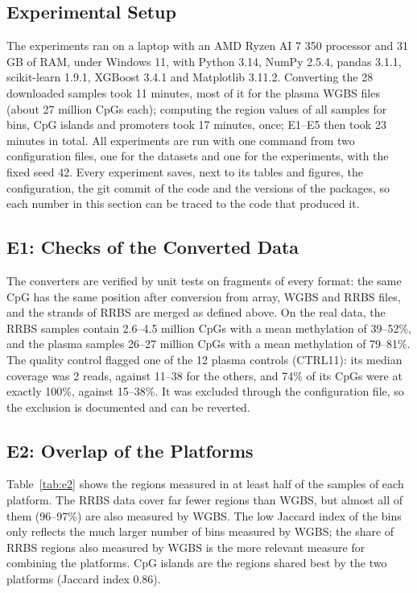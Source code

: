 \documentclass[runningheads]{llncs}
\begin{document}
\subsection{Experimental Setup}
The experiments ran on a laptop with an AMD Ryzen AI 7 350 processor and 31\,GB of RAM, under Windows 11, with Python 3.14, NumPy 2.5.4, pandas 3.1.1, scikit-learn 1.9.1, XGBoost 3.4.1 and Matplotlib 3.11.2. Converting the 28 downloaded samples took 11 minutes, most of it for the plasma WGBS files (about 27 million CpGs each); computing the region values of all samples for bins, CpG islands and promoters took 17 minutes, once; E1--E5 then took 23 minutes in total. All experiments are run with one command from two configuration files, one for the datasets and one for the experiments, with the fixed seed 42. Every experiment saves, next to its tables and figures, the configuration, the git commit of the code and the versions of the packages, so each number in this section can be traced to the code that produced it.

\subsection{E1: Checks of the Converted Data}
The converters are verified by unit tests on fragments of every format: the same CpG has the same position after conversion from array, WGBS and RRBS files, and the strands of RRBS are merged as defined above. On the real data, the RRBS samples contain 2.6--4.5 million CpGs with a mean methylation of 39--52\%, and the plasma samples 26--27 million CpGs with a mean methylation of 79--81\%. The quality control flagged one of the 12 plasma controls (CTRL11): its median coverage was 2 reads, against 11--38 for the others, and 74\% of its CpGs were at exactly 100\%, against 15--38\%. It was excluded through the configuration file, so the exclusion is documented and can be reverted.

\subsection{E2: Overlap of the Platforms}
Table~\ref{tab:e2} shows the regions measured in at least half of the samples of each platform. The RRBS data cover far fewer regions than WGBS, but almost all of them (96--97\%) are also measured by WGBS. The low Jaccard index of the bins only reflects the much larger number of bins measured by WGBS; the share of RRBS regions also measured by WGBS is the more relevant measure for combining the platforms. CpG islands are the regions shared best by the two platforms (Jaccard index 0.86).
\end{document}
